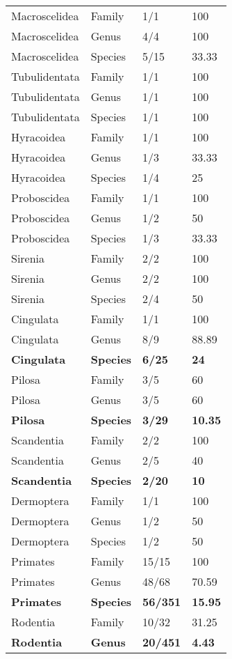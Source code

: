 \begin{longtable}{llll}
  Macroscelidea & Family & 1/1 & 100 \\ 
  Macroscelidea & Genus & 4/4 & 100 \\ 
  Macroscelidea & Species & 5/15 & 33.33 \\ 
  Tubulidentata & Family & 1/1 & 100 \\ 
  Tubulidentata & Genus & 1/1 & 100 \\ 
  Tubulidentata & Species & 1/1 & 100 \\ 
  Hyracoidea & Family & 1/1 & 100 \\ 
  Hyracoidea & Genus & 1/3 & 33.33 \\ 
  Hyracoidea & Species & 1/4 & 25 \\ 
  Proboscidea & Family & 1/1 & 100 \\ 
  Proboscidea & Genus & 1/2 & 50 \\ 
  Proboscidea & Species & 1/3 & 33.33 \\ 
  Sirenia & Family & 2/2 & 100 \\ 
  Sirenia & Genus & 2/2 & 100 \\ 
  Sirenia & Species & 2/4 & 50 \\ 
  Cingulata & Family & 1/1 & 100 \\ 
  Cingulata & Genus & 8/9 & 88.89 \\ 
  \textbf{Cingulata} & \textbf{Species} & \textbf{6/25} & \textbf{24} \\ 
  Pilosa & Family & 3/5 & 60 \\ 
  Pilosa & Genus & 3/5 & 60 \\ 
  \textbf{Pilosa} & \textbf{Species} & \textbf{3/29} & \textbf{10.35} \\ 
  Scandentia & Family & 2/2 & 100 \\ 
  Scandentia & Genus & 2/5 & 40 \\ 
  \textbf{Scandentia} & \textbf{Species} & \textbf{2/20} & \textbf{10} \\ 
  Dermoptera & Family & 1/1 & 100 \\ 
  Dermoptera & Genus & 1/2 & 50 \\ 
  Dermoptera & Species & 1/2 & 50 \\ 
  Primates & Family & 15/15 & 100 \\ 
  Primates & Genus & 48/68 & 70.59 \\ 
  \textbf{Primates} & \textbf{Species} & \textbf{56/351} & \textbf{15.95} \\ 
  Rodentia & Family & 10/32 & 31.25 \\ 
  \textbf{Rodentia} & \textbf{Genus} & \textbf{20/451} & \textbf{4.43} \\ 

\end{longtable}
